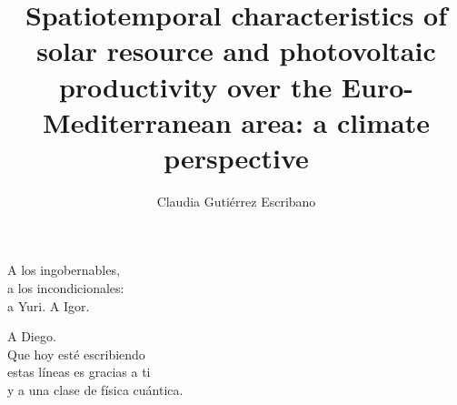 \documentclass[oldfontcommands, a4paper, 12pt]{memoir}%
\begin{document}

   
\pagestyle{empty}
\begin{titlingpage}


  
\title{Spatiotemporal characteristics of solar resource and photovoltaic productivity over the Euro-Mediterranean area: a climate perspective}%

\author{Claudia Gutiérrez Escribano}
\date{}

\titleUL
\newpage
\thispagestyle{empty}
\mbox{}
\maketitle

\end{titlingpage}

\frontmatter

\begin{flushright}
\null{}
A los ingobernables,\\ a los incondicionales:\\ a Yuri. A Igor.
\null
\end{flushright}

\cleardoublepage
 
\begin{flushright}
\null{}
A Diego.\\ Que hoy esté escribiendo\\ estas líneas es gracias a ti\\ y a una clase de física cuántica.
\null
\end{flushright}


% 
%



\clearpage



\clearpage

\cleardoublepage

% 
\tableofcontents
 
\printnomenclature


\mainmatter











\appendix

\backmatter

\printbibliography

\clearpage
\listoffigures
\clearpage
\listoftables
\end{document}
